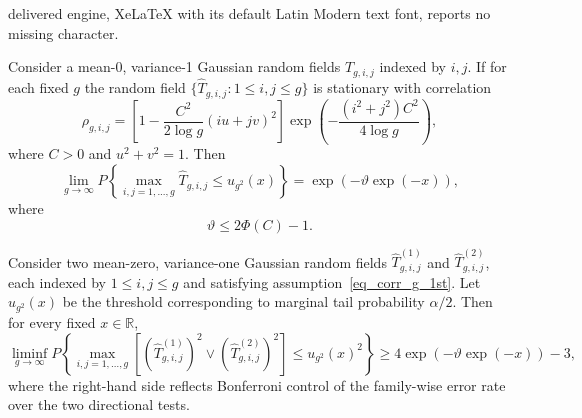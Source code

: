 \documentclass[10pt,a4paper]{amsart}
\begin{document}
delivered engine, XeLaTeX with its default Latin Modern text font, reports no missing character.
\begin{theorem}
	\label{SSS_extreme_1st}
	Consider a  mean-0, variance-1 Gaussian random fields $\hat{T}_{g,i,j}$ indexed by $i,j$. If for each fixed $g$ the random field $\{\hat{T}_{g,i,j}:1\leq i,j\leq g\}$  is stationary with correlation
	\begin{equation}
		\label{eq_corr_g_1st}
		\rho_{g,i,j}=[1-\frac{C^2}{2\log g}(iu+jv)^2]\exp(-\frac{(i^2+j^2)C^2}{4\log g}),
	\end{equation}
	where $C>0$ and $u^2+v^2=1$. Then
	\begin{equation*}
		\lim_{g\rightarrow\infty}P\left\{\max_{i,j=1,...,g}\hat{T}_{g,i,j}\leq u_{g^2}(x)\right\}=\exp(-\vartheta \exp(-x)),
	\end{equation*}
	where 
	\begin{equation}
		\label{eq-vartheta-1st}
		\vartheta\leq2\Phi(C)-1.
	\end{equation}
\end{theorem}

\begin{corollary}
	\label{corollary-1st-max}
	Consider two mean-zero, variance-one Gaussian random fields  
	\(\hat{T}^{(1)}_{g,i,j}\) and \(\hat{T}^{(2)}_{g,i,j}\), each indexed by \(1 \le i,j \le g\) and satisfying
	assumption~\eqref{eq_corr_g_1st}. Let \(u_{g^2}(x)\) be the threshold corresponding to marginal tail probability \(\alpha/2\). Then for every fixed \(x \in \mathbb{R}\),
	\[
	\liminf_{g \to \infty}
	P\left\{
	\max_{i,j = 1,\dots, g}
	\left[
	(\hat{T}^{(1)}_{g,i,j})^2 \vee (\hat{T}^{(2)}_{g,i,j})^2
	\right]
	\le u_{g^2}(x)^2
	\right\}
	\ge 4\exp(-\vartheta \exp(-x))-3,
	\]
	where the right-hand side reflects Bonferroni control of the family-wise error rate over the two directional tests.
\end{corollary}
\end{document}
